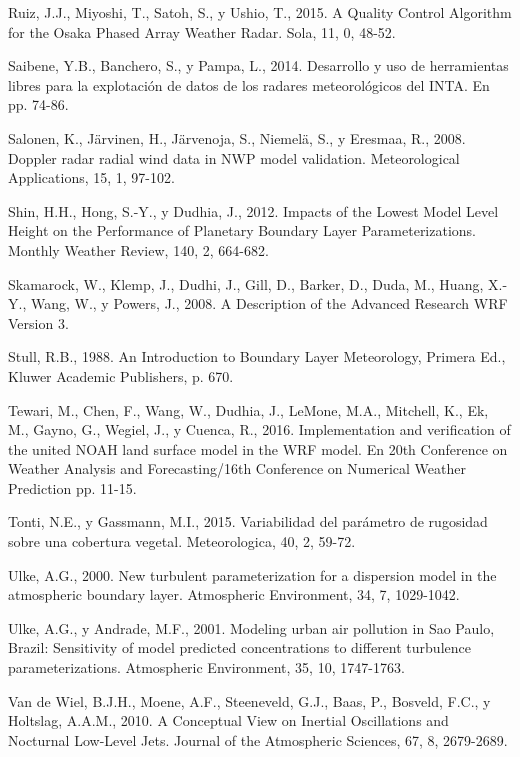 \documentclass[12pt,spanish,oneside]{book}
\begin{document}
\hypertarget{ref-Ruiz2015}{}
Ruiz, J.J., Miyoshi, T., Satoh, S., y Ushio, T., 2015. A Quality Control
Algorithm for the Osaka Phased Array Weather Radar. Sola, 11, 0, 48-52.

\hypertarget{ref-Saibene2014}{}
Saibene, Y.B., Banchero, S., y Pampa, L., 2014. Desarrollo y uso de
herramientas libres para la explotación de datos de los radares
meteorológicos del INTA. En pp. 74-86.

\hypertarget{ref-Salonen2008}{}
Salonen, K., Järvinen, H., Järvenoja, S., Niemelä, S., y Eresmaa, R.,
2008. Doppler radar radial wind data in NWP model validation.
Meteorological Applications, 15, 1, 97-102.

\hypertarget{ref-Shin2012}{}
Shin, H.H., Hong, S.-Y., y Dudhia, J., 2012. Impacts of the Lowest Model
Level Height on the Performance of Planetary Boundary Layer
Parameterizations. Monthly Weather Review, 140, 2, 664-682.

\hypertarget{ref-Skamarock2008}{}
Skamarock, W., Klemp, J., Dudhi, J., Gill, D., Barker, D., Duda, M.,
Huang, X.-Y., Wang, W., y Powers, J., 2008. A Description of the
Advanced Research WRF Version 3.

\hypertarget{ref-Stull1988}{}
Stull, R.B., 1988. An Introduction to Boundary Layer Meteorology,
Primera Ed., Kluwer Academic Publishers, p. 670.

\hypertarget{ref-Tewari2004}{}
Tewari, M., Chen, F., Wang, W., Dudhia, J., LeMone, M.A., Mitchell, K.,
Ek, M., Gayno, G., Wegiel, J., y Cuenca, R., 2016. Implementation and
verification of the united NOAH land surface model in the WRF model. En
20th Conference on Weather Analysis and Forecasting/16th Conference on
Numerical Weather Prediction pp. 11-15.

\hypertarget{ref-Tonti2015}{}
Tonti, N.E., y Gassmann, M.I., 2015. Variabilidad del parámetro de
rugosidad sobre una cobertura vegetal. Meteorologica, 40, 2, 59-72.

\hypertarget{ref-Ulke2000}{}
Ulke, A.G., 2000. New turbulent parameterization for a dispersion model
in the atmospheric boundary layer. Atmospheric Environment, 34, 7,
1029-1042.

\hypertarget{ref-Ulke2001}{}
Ulke, A.G., y Andrade, M.F., 2001. Modeling urban air pollution in Sao
Paulo, Brazil: Sensitivity of model predicted concentrations to
different turbulence parameterizations. Atmospheric Environment, 35, 10,
1747-1763.

\hypertarget{ref-VanDeWiel2010}{}
Van de Wiel, B.J.H., Moene, A.F., Steeneveld, G.J., Baas, P., Bosveld,
F.C., y Holtslag, A.A.M., 2010. A Conceptual View on Inertial
Oscillations and Nocturnal Low-Level Jets. Journal of the Atmospheric
Sciences, 67, 8, 2679-2689.
\end{document}
